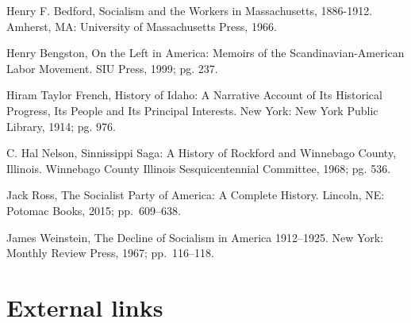 Henry F. Bedford, Socialism and the Workers in Massachusetts, 1886-1912.
Amherst, MA: University of Massachusetts Press, 1966.

Henry Bengston, On the Left in America: Memoirs of the
Scandinavian-American Labor Movement. SIU Press, 1999; pg. 237.

Hiram Taylor French, History of Idaho: A Narrative Account of Its
Historical Progress, Its People and Its Principal Interests. New York:
New York Public Library, 1914; pg. 976.

C. Hal Nelson, Sinnissippi Saga: A History of Rockford and Winnebago
County, Illinois. Winnebago County Illinois Sesquicentennial Committee,
1968; pg. 536.

Jack Ross, The Socialist Party of America: A Complete History. Lincoln,
NE: Potomac Books, 2015; pp.~609--638.

James Weinstein, The Decline of Socialism in America 1912--1925. New
York: Monthly Review Press, 1967; pp.~116--118.

\section{External links}\label{external-links}
